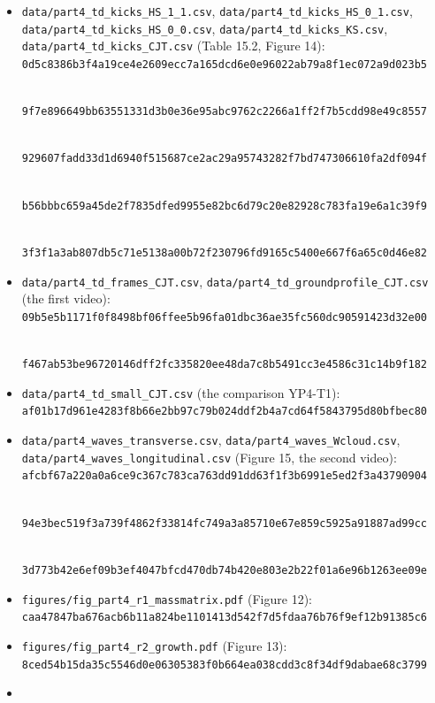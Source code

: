 \documentclass[
  10pt,
]{article}
\begin{document}
\begin{itemize}
\item
  \texttt{data/part4\_td\_kicks\_HS\_1\_1.csv},
  \texttt{data/part4\_td\_kicks\_HS\_0\_1.csv},
  \texttt{data/part4\_td\_kicks\_HS\_0\_0.csv},
  \texttt{data/part4\_td\_kicks\_KS.csv},
  \texttt{data/part4\_td\_kicks\_CJT.csv} (Table 15.2, Figure 14):\\
  \texttt{0d5c8386b3f4a19ce4e2609ecc7a165dcd6e0e96022ab79a8f1ec072a9d023b5}\strut \\
  \texttt{9f7e896649bb63551331d3b0e36e95abc9762c2266a1ff2f7b5cdd98e49c8557}\strut \\
  \texttt{929607fadd33d1d6940f515687ce2ac29a95743282f7bd747306610fa2df094f}\strut \\
  \texttt{b56bbbc659a45de2f7835dfed9955e82bc6d79c20e82928c783fa19e6a1c39f9}\strut \\
  \texttt{3f3f1a3ab807db5c71e5138a00b72f230796fd9165c5400e667f6a65c0d46e82}
\item
  \texttt{data/part4\_td\_frames\_CJT.csv},
  \texttt{data/part4\_td\_groundprofile\_CJT.csv} (the first video):\\
  \texttt{09b5e5b1171f0f8498bf06ffee5b96fa01dbc36ae35fc560dc90591423d32e00}\strut \\
  \texttt{f467ab53be96720146dff2fc335820ee48da7c8b5491cc3e4586c31c14b9f182}
\item
  \texttt{data/part4\_td\_small\_CJT.csv} (the comparison YP4-T1):\\
  \texttt{af01b17d961e4283f8b66e2bb97c79b024ddf2b4a7cd64f5843795d80bfbec80}
\item
  \texttt{data/part4\_waves\_transverse.csv},
  \texttt{data/part4\_waves\_Wcloud.csv},
  \texttt{data/part4\_waves\_longitudinal.csv} (Figure 15, the second
  video):\\
  \texttt{afcbf67a220a0a6ce9c367c783ca763dd91dd63f1f3b6991e5ed2f3a43790904}\strut \\
  \texttt{94e3bec519f3a739f4862f33814fc749a3a85710e67e859c5925a91887ad99cc}\strut \\
  \texttt{3d773b42e6ef09b3ef4047bfcd470db74b420e803e2b22f01a6e96b1263ee09e}
\item
  \texttt{figures/fig\_part4\_r1\_massmatrix.pdf} (Figure 12):\\
  \texttt{caa47847ba676acb6b11a824be1101413d542f7d5fdaa76b76f9ef12b91385c6}
\item
  \texttt{figures/fig\_part4\_r2\_growth.pdf} (Figure 13):\\
  \texttt{8ced54b15da35c5546d0e06305383f0b664ea038cdd3c8f34df9dabae68c3799}
\item

\end{itemize}
\end{document}
